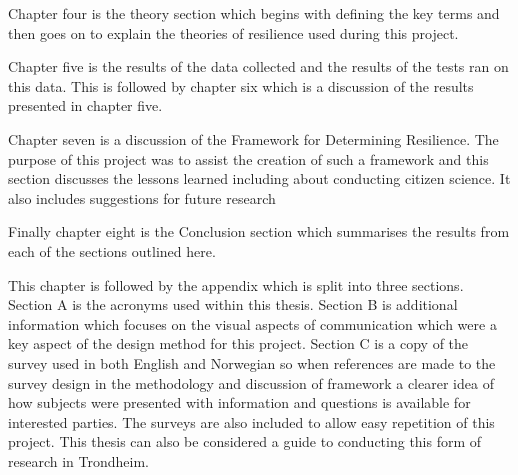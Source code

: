 Chapter four is the theory section which begins with defining the key terms and then goes on to explain the theories of resilience used during this project.

Chapter five is the results of the data collected and the results of the tests ran on this data. This is followed by chapter six which is a discussion of the results presented in chapter five. 


Chapter seven is a discussion of the Framework for Determining Resilience. The purpose of this project was to assist the creation of such a framework and this section discusses the lessons learned including about conducting citizen science. It also includes suggestions for future research

Finally chapter eight is the Conclusion section which summarises the results from each of the sections outlined here.

This chapter is followed by the appendix which is split into three sections. Section A is the acronyms used within this thesis. Section B is additional information which focuses on the visual aspects of communication which were a key aspect of the design method for this project. Section C is a copy of the survey used in both English and Norwegian so when references are made to the survey design in the methodology and  discussion of framework a clearer idea of how subjects were presented with information and questions is available for interested parties. The surveys are also included to allow easy repetition of this project. This thesis can also be considered a guide to conducting this form of research in Trondheim. 
